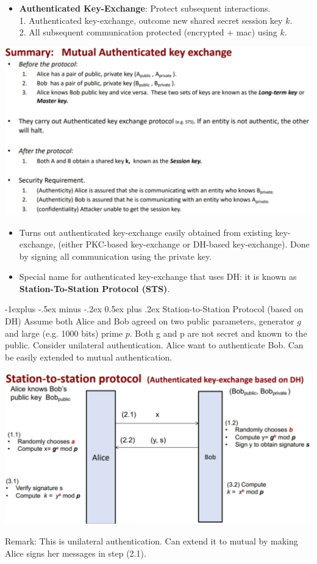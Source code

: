 \documentclass[10pt, landscape]{article}
\makeatletter
\renewcommand{\subsection}{\@startsection{subsection}{2}{0mm}%
                                {-1explus -.5ex minus -.2ex}%
                                {0.5ex plus .2ex}%
                                {\normalfont\normalsize\bfseries}}
\makeatother
\begin{document}
\begin{multicols*}{3}
\begin{itemize}
\item \textbf{Authenticated Key-Exchange}: Protect subsequent interactions. \\
1. Authenticated key-exchange, outcome new shared secret session key $k$. \\
2. All subsequent communication protected (encrypted + mac) using $k$.
\end{itemize}
\centerline{\includegraphics[width=1\linewidth]{authKeyExchangeSummary}}	

\begin{itemize}
\item Turns out authenticated key-exchange easily obtained from existing key-exchange, (either PKC-based key-exchange or DH-based key-exchange). Done by signing all
communication using the private key.
\item Special name for authenticated key-exchange that uses DH: it is known as \textbf{Station-To-Station Protocol (STS)}.
\end{itemize}

\subsection{Station-to-Station Protocol (based on DH)}
Assume both Alice and Bob agreed on two public parameters, generator $g$ and large (e.g. 1000 bits) prime $p$. Both g and p are not secret and known to the public.
Consider unilateral authentication. Alice want to authenticate Bob. Can be easily extended to mutual authentication. 
\centerline{\includegraphics[width=1\linewidth]{stationToStation}}	
Remark: This is unilateral authentication. Can extend it to mutual by making Alice signs her messages in step (2.1).


\end{multicols*}
\end{document}
